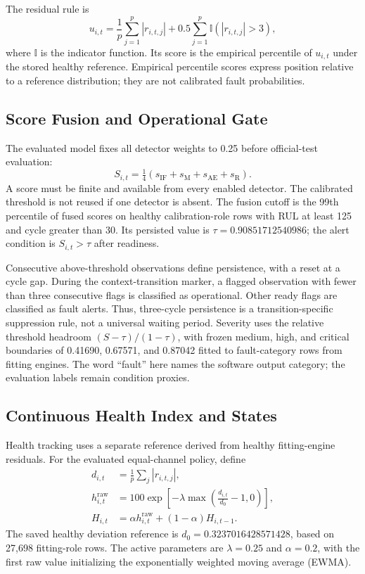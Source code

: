 \documentclass[conference]{IEEEtran}
\begin{document}
The residual rule is
\begin{equation}
u_{i,t}=\frac{1}{p}\sum_{j=1}^{p}|r_{i,t,j}|+
0.5\sum_{j=1}^{p}\mathbb{I}(|r_{i,t,j}|>3),
\end{equation}
where $\mathbb{I}$ is the indicator function. Its score is the empirical percentile of $u_{i,t}$ under the stored healthy reference. Empirical percentile scores express position relative to a reference distribution; they are not calibrated fault probabilities.

\subsection{Score Fusion and Operational Gate}
The evaluated model fixes all detector weights to 0.25 before official-test evaluation:
\begin{equation}
S_{i,t}=\tfrac14(s_{\mathrm{IF}}+s_{\mathrm{M}}+s_{\mathrm{AE}}+s_{\mathrm{R}}).
\end{equation}
A score must be finite and available from every enabled detector. The calibrated threshold is not reused if one detector is absent. The fusion cutoff is the 99th percentile of fused scores on healthy calibration-role rows with RUL at least 125 and cycle greater than 30. Its persisted value is $\tau=0.90851712540986$; the alert condition is $S_{i,t}>\tau$ after readiness.

Consecutive above-threshold observations define persistence, with a reset at a cycle gap. During the context-transition marker, a flagged observation with fewer than three consecutive flags is classified as operational. Other ready flags are classified as fault alerts. Thus, three-cycle persistence is a transition-specific suppression rule, not a universal waiting period. Severity uses the relative threshold headroom $(S-\tau)/(1-\tau)$, with frozen medium, high, and critical boundaries of 0.41690, 0.67571, and 0.87042 fitted to fault-category rows from fitting engines. The word ``fault'' here names the software output category; the evaluation labels remain condition proxies.

\subsection{Continuous Health Index and States}
Health tracking uses a separate reference derived from healthy fitting-engine residuals. For the evaluated equal-channel policy, define
\begin{align}
d_{i,t}&=\frac{1}{p}\sum_j|r_{i,t,j}|,\\
h^{\mathrm{raw}}_{i,t}&=100\exp\!\left[-\lambda\max\left(\frac{d_{i,t}}{d_0}-1,0\right)\right],\\
H_{i,t}&=\alpha h^{\mathrm{raw}}_{i,t}+(1-\alpha)H_{i,t-1}.
\label{eq:health}
\end{align}
The saved healthy deviation reference is $d_0=0.3237016428571428$, based on 27,698 fitting-role rows. The active parameters are $\lambda=0.25$ and $\alpha=0.2$, with the first raw value initializing the exponentially weighted moving average (EWMA).
\end{document}
